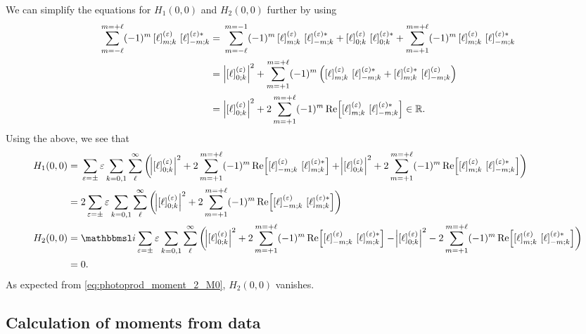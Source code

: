 We can simplify the equations for $H_1(0, 0)$ and $H_2(0, 0)$ further
by using
\begin{align}
  \sum_{m = -\ell}^{m = +\ell}
  (-1)^m \sBrk{\ell}^{(\refl)}_{m; k}\, \sBrk{\ell}^{(\refl) *}_{{-m}; k}
  ={}& \sum_{m = -\ell}^{m = -1}
  (-1)^m \sBrk{\ell}^{(\refl)}_{m; k}\, \sBrk{\ell}^{(\refl) *}_{{-m}; k}
  + \sBrk{\ell}^{(\refl)}_{0; k}\, \sBrk{\ell}^{(\refl) *}_{0; k}
  + \sum_{m = +1}^{m = +\ell}
  (-1)^m \sBrk{\ell}^{(\refl)}_{m; k}\, \sBrk{\ell}^{(\refl) *}_{{-m}; k} \notag
  \\
  ={}& \Abs[2]{\sBrk{\ell}^{(\refl)}_{0; k}}^2
  + \sum_{m = +1}^{m = +\ell}
  (-1)^m \rBrk[2]{\sBrk{\ell}^{(\refl)}_{m; k}\, \sBrk{\ell}^{(\refl) *}_{{-m}; k} + \sBrk{\ell}^{(\refl) *}_{m; k}\, \sBrk{\ell}^{(\refl)}_{{-m}; k}} \notag
  \\
  ={}& \Abs[2]{\sBrk{\ell}^{(\refl)}_{0; k}}^2
  + 2 \sum_{m = +1}^{m = +\ell}
  (-1)^m \Re[2]{\sBrk{\ell}^{(\refl)}_{m; k}\, \sBrk{\ell}^{(\refl) *}_{{-m}; k}}
  \in \mathbb{R}.
\end{align}
Using the above, we see that
\begin{align}
  H_1(0, 0)
  ={}& \sum_{\refl = \pm} \refl \sum_{k = 0, 1} \sum_{\ell}^\infty
  \rBrk[3]{\Abs[2]{\sBrk{\ell}^{(\refl)}_{0; k}}^2
  + 2 \sum_{m = +1}^{m = +\ell}
  (-1)^m \Re[2]{\sBrk{\ell}^{(\refl)}_{{-m}; k}\, \sBrk{\ell}^{(\refl) *}_{m; k}}
  + \Abs[2]{\sBrk{\ell}^{(\refl)}_{0; k}}^2
  + 2 \sum_{m = +1}^{m = +\ell}
  (-1)^m \Re[2]{\sBrk{\ell}^{(\refl)}_{m; k}\, \sBrk{\ell}^{(\refl) *}_{{-m}; k}}} \notag
  \\
  ={}& 2 \sum_{\refl = \pm} \refl \sum_{k = 0, 1} \sum_{\ell}^\infty
  \rBrk[3]{\Abs[2]{\sBrk{\ell}^{(\refl)}_{0; k}}^2
  + 2 \sum_{m = +1}^{m = +\ell}
  (-1)^m \Re[2]{\sBrk{\ell}^{(\refl)}_{{-m}; k}\, \sBrk{\ell}^{(\refl) *}_{m; k}}}
  \\
  H_2(0, 0)
  ={}& \imag \sum_{\refl = \pm} \refl \sum_{k = 0, 1} \sum_{\ell}^\infty
  \rBrk[3]{\Abs[2]{\sBrk{\ell}^{(\refl)}_{0; k}}^2
  + 2 \sum_{m = +1}^{m = +\ell}
  (-1)^m \Re[2]{\sBrk{\ell}^{(\refl)}_{{-m}; k}\, \sBrk{\ell}^{(\refl) *}_{m; k}}
  - \Abs[2]{\sBrk{\ell}^{(\refl)}_{0; k}}^2
  - 2 \sum_{m = +1}^{m = +\ell}
  (-1)^m \Re[2]{\sBrk{\ell}^{(\refl)}_{m; k}\, \sBrk{\ell}^{(\refl) *}_{{-m}; k}}} \notag
  \\
  ={}& 0.
\end{align}
As expected from \cref{eq:photoprod_moment_2_M0}, $H_2(0, 0)$
vanishes.


\subsection{Calculation of moments from data}%
\label{sec:photoprod:moments_data}

